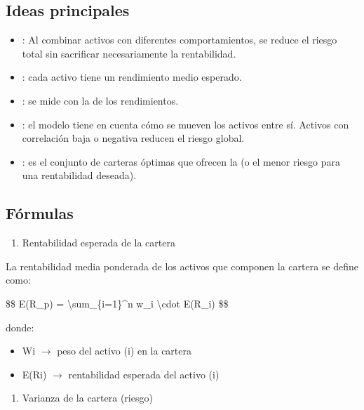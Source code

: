 \documentclass[letterpaper,10pt,spanish]{sphinxmanual}
\begin{document}
\subsection{Ideas principales}
\label{\detokenize{MarcoTeorico:ideas-principales}}\begin{itemize}
\item {} 
\sphinxAtStartPar
{}: Al combinar activos con diferentes comportamientos, se reduce el riesgo total sin sacrificar necesariamente la rentabilidad.

\item {} 
\sphinxAtStartPar
{}: cada activo tiene un rendimiento medio esperado.

\item {} 
\sphinxAtStartPar
{}: se mide con la  de los rendimientos.

\item {} 
\sphinxAtStartPar
{}: el modelo tiene en cuenta cómo se mueven los activos entre sí. Activos con correlación baja o negativa reducen el riesgo global.

\item {} 
\sphinxAtStartPar
{}: es el conjunto de carteras óptimas que ofrecen la  (o el menor riesgo para una rentabilidad deseada).

\end{itemize}


\subsection{Fórmulas}
\label{\detokenize{MarcoTeorico:formulas}}\begin{enumerate}
%
\item {} 
\sphinxAtStartPar
Rentabilidad esperada de la cartera

\end{enumerate}

\sphinxAtStartPar
La rentabilidad media ponderada de los activos que componen la cartera se define como:

\sphinxAtStartPar
\$\$
E(R\_p) = \textbackslash{}sum\_\{i=1\}\textasciicircum{}n w\_i \textbackslash{}cdot E(R\_i)
\$\$

\sphinxAtStartPar
donde:
\begin{itemize}
\item {} 
\sphinxAtStartPar
Wi \(\rightarrow\) peso del activo (i) en la cartera

\item {} 
\sphinxAtStartPar
E(Ri) \(\rightarrow\) rentabilidad esperada del activo (i)

\end{itemize}
\begin{enumerate}
%
\setcounter{enumi}{1}
\item {} 
\sphinxAtStartPar
Varianza de la cartera (riesgo)

\end{enumerate}
\end{document}
